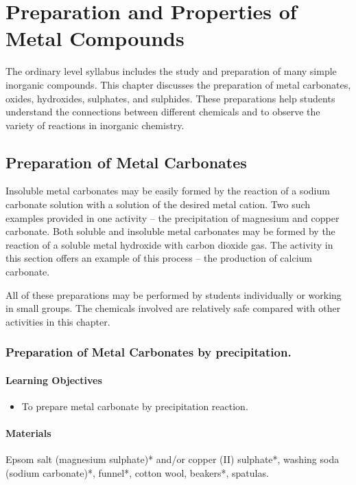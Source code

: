 \chapter{Preparation and Properties of Metal Compounds}

The ordinary level syllabus includes the study and preparation of many simple inorganic compounds. This chapter discusses the preparation of metal carbonates, oxides, hydroxides, sulphates, and sulphides. These preparations help students understand the connections between different chemicals and to observe the variety of reactions in inorganic chemistry.

\section{Preparation of Metal Carbonates}

Insoluble metal carbonates may be easily formed by the reaction of a sodium carbonate solution with a solution of the desired metal cation. Two such examples provided in one activity -- the precipitation of magnesium and copper carbonate. Both soluble and insoluble metal carbonates may be formed by the reaction of a soluble metal hydroxide with carbon dioxide gas. The activity in this section offers an example of this process -- the production of calcium carbonate.

All of these preparations may be performed by students individually or working in small groups. The chemicals involved are relatively safe compared with other activities in this chapter.

\subsection{Preparation of Metal Carbonates by precipitation.}

\subsubsection*{Learning Objectives}
\begin{itemize}
\item{To prepare metal carbonate by precipitation reaction.}
\end{itemize}

\subsubsection*{Materials}
Epsom salt (magnesium sulphate)* and/or copper (II) sulphate*, washing soda (sodium carbonate)*, funnel*, cotton wool, beakers*, spatulas.

